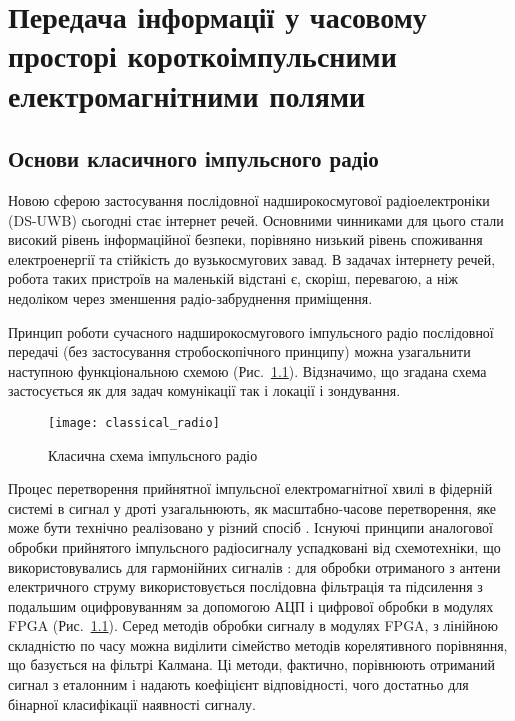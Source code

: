 \chapter{Передача інформації у часовому просторі короткоімпульсними 
електромагнітними полями}
\label{ch:neuron}

\section{Основи класичного імпульсного радіо}

Новою сферою застосування послідовної 
надширокосмугової радіоелектроніки (DS-UWB) сьогодні стає інтернет речей. 
Основними чинниками для цього стали високий рівень інформаційної безпеки, 
порівняно низький рівень споживання електроенергії та стійкість до 
вузькосмугових завад. В задачах інтернету речей, робота таких пристроїв на 
маленькій відстані є, скоріш, перевагою, а ніж недоліком через
зменшення радіо-забруднення приміщення.

Принцип роботи сучасного надширокосмугового імпульсного радіо 
послідовної передачі (без застосування стробоскопічного принципу) 
\cite{imp:ChannelImplementation} можна узагальнити наступною 
функціональною схемою (Рис.~\ref{fig:emp_radio}). Відзначимо, що згадана
схема застосується як для задач комунікації так і локації і зондування.

\begin{figure}[htbp] \begin{center}
\texttt{[image: classical\_radio]}
\caption{Класична схема імпульсного радіо} \label{fig:emp_radio}
\end{center} \end{figure}

Процес перетворення прийнятної імпульсної електромагнітної хвилі в фідерній 
системі в сигнал у дроті узагальнюють, як масштабно-часове перетворення, яке 
може бути технічно реалізовано у різний спосіб \cite{imp:Astanin1989}. 
Існуючі принципи аналогової обробки прийнятого імпульсного радіосигналу 
успадковані від схемотехніки, що використовувались для гармонійних сигналів 
\cite{imp:ComunicationsOverview}: для обробки отриманого з антени 
електричного струму використовується послідовна фільтрація та підсилення з 
подальшим оцифровуванням за допомогою АЦП і цифрової обробки в модулях 
FPGA (Рис.~\ref{fig:emp_radio}). Серед методів обробки сигналу в модулях FPGA, 
з лінійною складністю по часу можна виділити сімейство методів корелятивного 
порівняння, що базується на фільтрі Калмана. Ці методи, фактично, 
порівнюють отриманий сигнал з еталонним і надають коефіцієнт відповідності, 
чого достатньо для бінарної класифікації наявності сигналу. 

